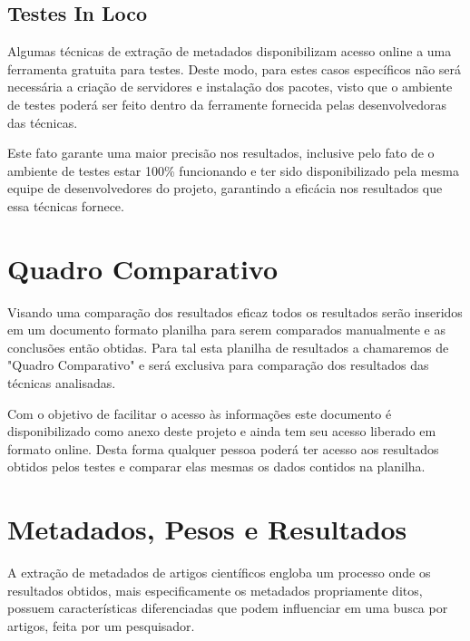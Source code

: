 \subsection{Testes In Loco}


Algumas técnicas de extração de metadados disponibilizam acesso online a uma ferramenta gratuita para testes. Deste modo, para estes casos específicos não será necessária a criação de servidores e instalação dos pacotes, visto que o ambiente de testes poderá ser feito dentro da ferramente fornecida pelas desenvolvedoras das técnicas.


Este fato garante uma maior precisão nos resultados, inclusive pelo fato de o ambiente de testes estar 100\% funcionando e ter sido disponibilizado pela mesma equipe de desenvolvedores do projeto, garantindo a eficácia nos resultados que essa técnicas fornece.

\section{Quadro Comparativo}

Visando uma comparação dos resultados eficaz todos os resultados serão inseridos em um documento formato planilha para serem comparados manualmente e as conclusões então obtidas. Para tal esta planilha de resultados a chamaremos de "Quadro Comparativo" e será exclusiva para comparação dos resultados das técnicas analisadas.


Com o objetivo de facilitar o acesso às informações este documento é disponibilizado como anexo deste projeto e ainda tem seu acesso liberado em formato online. Desta forma qualquer pessoa poderá ter acesso aos resultados obtidos pelos testes e comparar elas mesmas os dados contidos na planilha.

\section{Metadados, Pesos e Resultados}


A extração de metadados de artigos científicos engloba um processo onde os resultados obtidos, mais especificamente os metadados propriamente ditos, possuem características diferenciadas que podem influenciar em uma busca por artigos, feita por um pesquisador.

